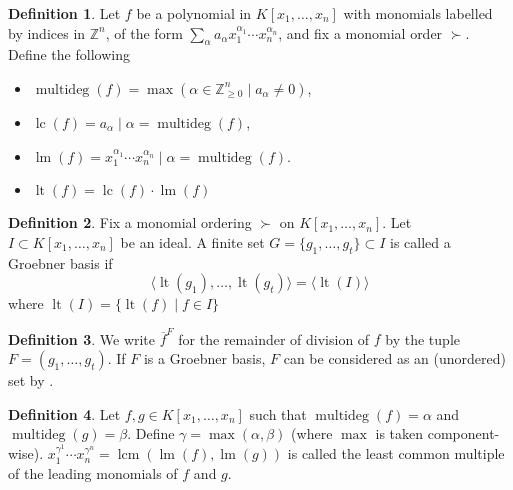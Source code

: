 \documentclass[
]{book}
\theoremstyle{definition}
\newtheorem{definition}{Definition}[chapter]
\theoremstyle{definition}
\theoremstyle{definition}
\theoremstyle{definition}
\theoremstyle{remark}
\begin{document}
\begin{definition}

Let \(f\) be a polynomial in \(K[x_1,\ldots,x_n]\) with monomials labelled by indices in \(\mathbb{Z}^n\), of the form \(\sum_{\alpha} a_\alpha x_1^{\alpha_1} \cdots x_n^{\alpha_n}\), and fix a monomial order \(\succ\). Define the following

\begin{itemize}
\item
  \(\operatorname{multideg}(f) = \max\left( \alpha \in \mathbb{Z}^n_{\ge 0} \mid a_{\alpha} \ne 0 \right)\),
\item
  \(\operatorname{lc}(f) = a_{\alpha} \mid \alpha = \operatorname{multideg}(f)\),
\item
  \(\operatorname{lm}(f) = x_1^{\alpha_1} \cdots x_n^{\alpha_n} \mid \alpha = \operatorname{multideg}(f)\).
\item
  \(\operatorname{lt}(f) = \operatorname{lc}(f) \cdot \operatorname{lm}(f)\)
\end{itemize}

\end{definition}

\begin{definition}
Fix a monomial ordering \(\succ\) on \(K[x_1,\ldots,x_n]\). Let \(I \subset K[x_1,\ldots,x_n]\) be an ideal. A finite set \(G = \{ g_1, \ldots, g_t \} \subset I\) is called a Groebner basis if
\[
\langle \operatorname{lt}(g_1),\ldots,\operatorname{lt}(g_t) \rangle = \langle\operatorname{lt}(I)\rangle
\]
where \(\operatorname{lt}(I) = \{ \operatorname{lt}(f) \mid f \in I \}\)
\end{definition}

\begin{definition}
We write \(\overline{f}^{F}\) for the remainder of division of \(f\) by the tuple \(F = (g_1,\ldots,g_t)\). If \(F\) is a Groebner basis, \(F\) can be considered as an (unordered) set by \citep[ p83, Proposition 1]{cox2013}.
\end{definition}

\begin{definition}
Let \(f,g \in K[x_1,\ldots,x_n]\) such that \(\operatorname{multideg}(f) = \alpha\) and \(\operatorname{multideg}(g) = \beta\). Define \(\gamma = \max(\alpha, \beta)\) (where \(\max\) is taken component-wise). \(x_1^{\gamma^1} \cdots x_n^{\gamma^n} = \operatorname{lcm}( \operatorname{lm}(f), \operatorname{lm}(g) )\) is called the least common multiple of the leading monomials of \(f\) and \(g\).
\end{definition}
\end{document}
